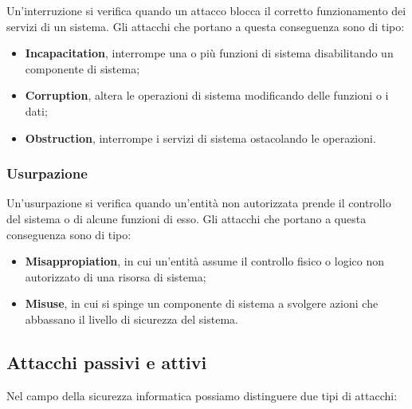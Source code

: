 \documentclass[14pt]{extarticle}
\begin{document}
Un'interruzione si verifica quando un attacco blocca il corretto funzionamento
dei servizi di un sistema. Gli attacchi che portano a questa conseguenza sono di
tipo:
\begin{itemize}
    \item \textbf{Incapacitation}, interrompe una o più funzioni di sistema
    disabilitando un componente di sistema;
    \item \textbf{Corruption}, altera le operazioni di sistema modificando delle
    funzioni o i dati;
    \item \textbf{Obstruction}, interrompe i servizi di sistema ostacolando le
    operazioni.    
\end{itemize}

\subsubsection{Usurpazione}

Un'usurpazione si verifica quando un'entità non autorizzata prende il controllo
del sistema o di alcune funzioni di esso. Gli attacchi che portano a questa
conseguenza sono di tipo:
\begin{itemize}
    \item \textbf{Misappropiation}, in cui un'entità assume il controllo fisico
    o logico non autorizzato di una risorsa di sistema;
    \item \textbf{Misuse}, in cui si spinge un componente di sistema a svolgere
    azioni che abbassano il livello di sicurezza del sistema. 
\end{itemize}

\newpage
\subsection{Attacchi passivi e attivi}

Nel campo della sicurezza informatica possiamo distinguere due tipi di attacchi:
\end{document}
